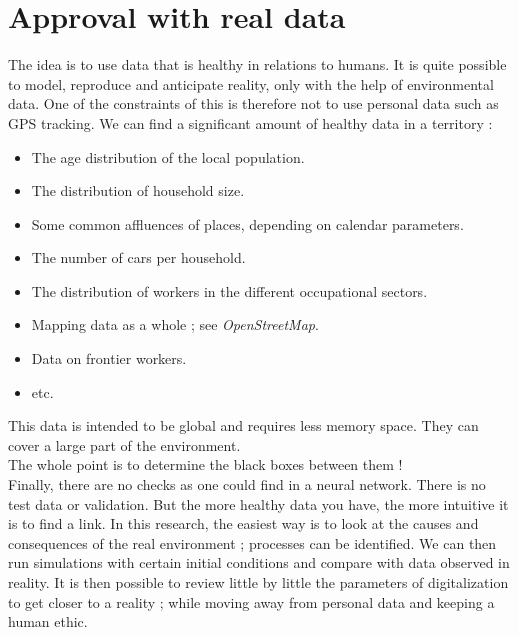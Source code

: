 \chapter{Approval with real data}

The idea is to use data that is healthy in relations to humans. It is quite possible to model, reproduce and anticipate reality, only with the help of environmental data. One of the constraints of this is therefore not to use personal data such as GPS tracking. We can find a significant amount of healthy data in a territory :\\

\begin{itemize}
\item The age distribution of the local population.
\item The distribution of household size.
\item Some common affluences of places, depending on calendar parameters.
\item The number of cars per household.
\item The distribution of workers in the different occupational sectors.
\item Mapping data as a whole ; see \textit{OpenStreetMap}.
\item Data on frontier workers.
\item etc.\\
\end{itemize}


This data is intended to be global and requires less memory space. They can cover a large part of the environment.\\

The whole point is to determine the black boxes between them !\\
Finally, there are no checks as one could find in a neural network. There is no test data or validation. But the more healthy data you have, the more intuitive it is to find a link. In this research, the easiest way is to look at the causes and consequences of the real environment ; processes can be identified. We can then run simulations with certain initial conditions and compare with data observed in reality. It is then possible to review little by little the parameters of digitalization to get closer to a reality ; while moving away from personal data and keeping a human ethic.